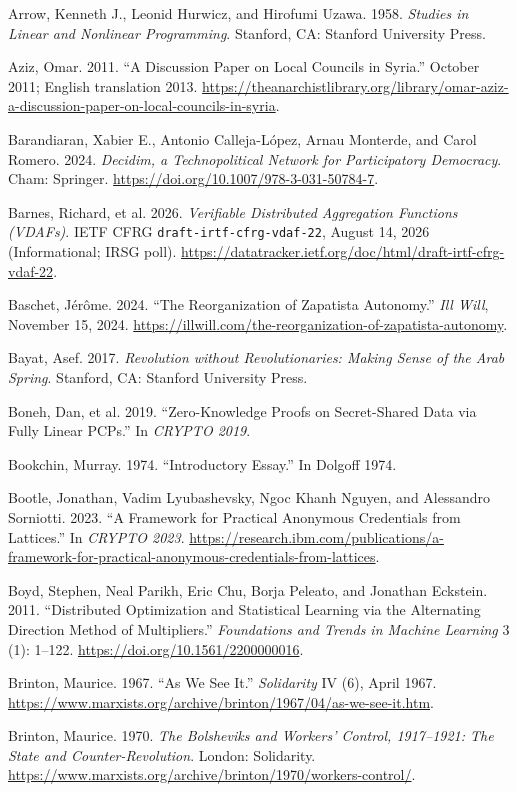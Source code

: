\documentclass[10pt,twoside,openany]{book}
\theoremstyle{dpepstyle}
\begin{document}
\begin{list}{}{\setlength{\leftmargin}{1.8em}\setlength{\itemindent}{-1.8em}\setlength{\itemsep}{3pt}\setlength{\parsep}{0pt}}
\item Arrow, Kenneth J., Leonid Hurwicz, and Hirofumi Uzawa. 1958. \emph{Studies in Linear and Nonlinear Programming}. Stanford, CA: Stanford University Press.
\item Aziz, Omar. 2011. ``A Discussion Paper on Local Councils in Syria.'' October 2011; English translation 2013. \url{https://theanarchistlibrary.org/library/omar-aziz-a-discussion-paper-on-local-councils-in-syria}.
\item Barandiaran, Xabier E., Antonio Calleja-L\'opez, Arnau Monterde, and Carol Romero. 2024. \emph{Decidim, a Technopolitical Network for Participatory Democracy}. Cham: Springer. \url{https://doi.org/10.1007/978-3-031-50784-7}.
\item Barnes, Richard, et al. 2026. \emph{Verifiable Distributed Aggregation Functions (VDAFs)}. IETF CFRG \texttt{draft-irtf-cfrg-vdaf-22}, August 14, 2026 (Informational; IRSG poll). \url{https://datatracker.ietf.org/doc/html/draft-irtf-cfrg-vdaf-22}.
\item Baschet, J\'er\^ome. 2024. ``The Reorganization of Zapatista Autonomy.'' \emph{Ill Will}, November 15, 2024. \url{https://illwill.com/the-reorganization-of-zapatista-autonomy}.
\item Bayat, Asef. 2017. \emph{Revolution without Revolutionaries: Making Sense of the Arab Spring}. Stanford, CA: Stanford University Press.
\item Boneh, Dan, et al. 2019. ``Zero-Knowledge Proofs on Secret-Shared Data via Fully Linear PCPs.'' In \emph{CRYPTO 2019}.
\item Bookchin, Murray. 1974. ``Introductory Essay.'' In Dolgoff 1974.
\item Bootle, Jonathan, Vadim Lyubashevsky, Ngoc Khanh Nguyen, and Alessandro Sorniotti. 2023. ``A Framework for Practical Anonymous Credentials from Lattices.'' In \emph{CRYPTO 2023}. \url{https://research.ibm.com/publications/a-framework-for-practical-anonymous-credentials-from-lattices}.
\item Boyd, Stephen, Neal Parikh, Eric Chu, Borja Peleato, and Jonathan Eckstein. 2011. ``Distributed Optimization and Statistical Learning via the Alternating Direction Method of Multipliers.'' \emph{Foundations and Trends in Machine Learning} 3 (1): 1--122. \url{https://doi.org/10.1561/2200000016}.
\item Brinton, Maurice. 1967. ``As We See It.'' \emph{Solidarity} IV (6), April 1967. \url{https://www.marxists.org/archive/brinton/1967/04/as-we-see-it.htm}.
\item Brinton, Maurice. 1970. \emph{The Bolsheviks and Workers' Control, 1917--1921: The State and Counter-Revolution}. London: Solidarity. \url{https://www.marxists.org/archive/brinton/1970/workers-control/}.

\end{list}
\end{document}
